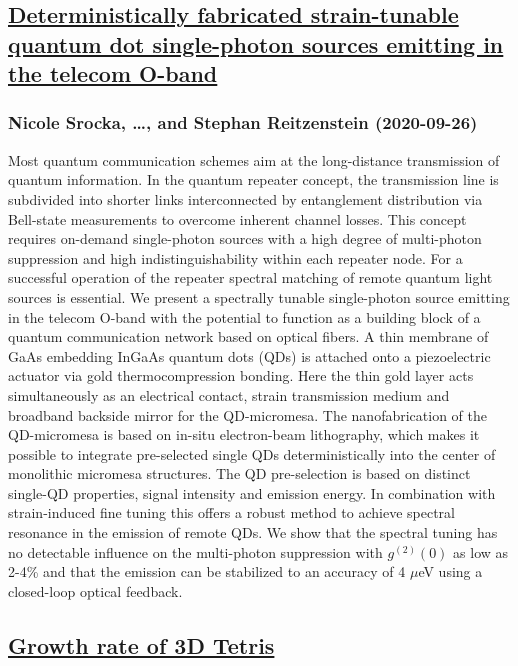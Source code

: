 \subsection*{\href{http://arxiv.org/abs/2009.12543v1}{Deterministically fabricated strain-tunable quantum dot single-photon  sources emitting in the telecom O-band}}
\subsubsection*{Nicole Srocka, \dots, and Stephan Reitzenstein (2020-09-26)}
Most quantum communication schemes aim at the long-distance transmission of
quantum information. In the quantum repeater concept, the transmission line is
subdivided into shorter links interconnected by entanglement distribution via
Bell-state measurements to overcome inherent channel losses. This concept
requires on-demand single-photon sources with a high degree of multi-photon
suppression and high indistinguishability within each repeater node. For a
successful operation of the repeater spectral matching of remote quantum light
sources is essential. We present a spectrally tunable single-photon source
emitting in the telecom O-band with the potential to function as a building
block of a quantum communication network based on optical fibers. A thin
membrane of GaAs embedding InGaAs quantum dots (QDs) is attached onto a
piezoelectric actuator via gold thermocompression bonding. Here the thin gold
layer acts simultaneously as an electrical contact, strain transmission medium
and broadband backside mirror for the QD-micromesa. The nanofabrication of the
QD-micromesa is based on in-situ electron-beam lithography, which makes it
possible to integrate pre-selected single QDs deterministically into the center
of monolithic micromesa structures. The QD pre-selection is based on distinct
single-QD properties, signal intensity and emission energy. In combination with
strain-induced fine tuning this offers a robust method to achieve spectral
resonance in the emission of remote QDs. We show that the spectral tuning has
no detectable influence on the multi-photon suppression with $g^{(2)}(0)$ as
low as 2-4\% and that the emission can be stabilized to an accuracy of 4 $\mu$eV
using a closed-loop optical feedback.

\subsection*{\href{http://arxiv.org/abs/2009.12540v1}{Growth rate of 3D Tetris}}
